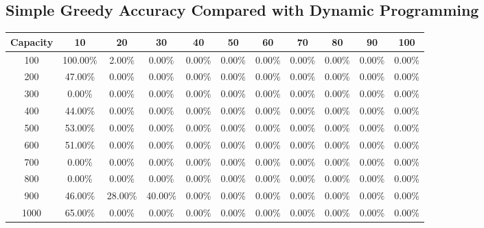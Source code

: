 \documentclass{article}
\begin{document}
\subsection{Simple Greedy Accuracy Compared with Dynamic Programming}
\begin{center}
\begin{tabular}{ccccccccccc}
\toprule
Capacity & 10 & 20 & 30 & 40 & 50 & 60 & 70 & 80 & 90 & 100 \\
\midrule
100 & 100.00\% & 2.00\% & 0.00\% & 0.00\% & 0.00\% & 0.00\% & 0.00\% & 0.00\% & 0.00\% & 0.00\% \\
200 & 47.00\% & 0.00\% & 0.00\% & 0.00\% & 0.00\% & 0.00\% & 0.00\% & 0.00\% & 0.00\% & 0.00\% \\
300 & 0.00\% & 0.00\% & 0.00\% & 0.00\% & 0.00\% & 0.00\% & 0.00\% & 0.00\% & 0.00\% & 0.00\% \\
400 & 44.00\% & 0.00\% & 0.00\% & 0.00\% & 0.00\% & 0.00\% & 0.00\% & 0.00\% & 0.00\% & 0.00\% \\
500 & 53.00\% & 0.00\% & 0.00\% & 0.00\% & 0.00\% & 0.00\% & 0.00\% & 0.00\% & 0.00\% & 0.00\% \\
600 & 51.00\% & 0.00\% & 0.00\% & 0.00\% & 0.00\% & 0.00\% & 0.00\% & 0.00\% & 0.00\% & 0.00\% \\
700 & 0.00\% & 0.00\% & 0.00\% & 0.00\% & 0.00\% & 0.00\% & 0.00\% & 0.00\% & 0.00\% & 0.00\% \\
800 & 0.00\% & 0.00\% & 0.00\% & 0.00\% & 0.00\% & 0.00\% & 0.00\% & 0.00\% & 0.00\% & 0.00\% \\
900 & 46.00\% & 28.00\% & 40.00\% & 0.00\% & 0.00\% & 0.00\% & 0.00\% & 0.00\% & 0.00\% & 0.00\% \\
1000 & 65.00\% & 0.00\% & 0.00\% & 0.00\% & 0.00\% & 0.00\% & 0.00\% & 0.00\% & 0.00\% & 0.00\% \\
\bottomrule
\end{tabular}
\end{center}
\end{document}
